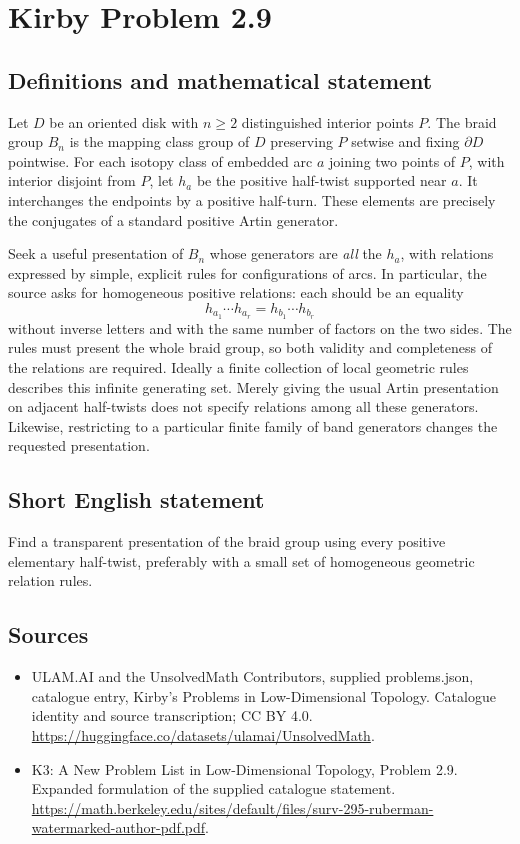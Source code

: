 \documentclass[11pt,a4paper]{article}
\begin{document}
\section*{Kirby Problem 2.9}\label{statement}

\subsection{Definitions and mathematical statement}
Let $D$ be an oriented disk with $n\geq2$ distinguished interior points $P$.
The braid group $B_n$ is the mapping class group of $D$ preserving $P$ setwise
and fixing $\partial D$ pointwise. For each isotopy class of embedded arc $a$
joining two points of $P$, with interior disjoint from $P$, let $h_a$ be the
positive half-twist supported near $a$. It interchanges the endpoints by a
positive half-turn. These elements are precisely the conjugates of a standard
positive Artin generator.

Seek a useful presentation of $B_n$ whose generators are \emph{all} the $h_a$,
with relations expressed by simple, explicit rules for configurations of arcs.
In particular, the source asks for homogeneous positive relations: each should
be an equality
\[
 h_{a_1}\cdots h_{a_r}=h_{b_1}\cdots h_{b_r}
\]
without inverse letters and with the same number of factors on the two sides.
The rules must present the whole braid group, so both validity and completeness
of the relations are required. Ideally a finite collection of local geometric
rules describes this infinite generating set. Merely giving the usual Artin
presentation on adjacent half-twists does not specify relations among all these
generators. Likewise, restricting to a particular finite family of band generators
changes the requested presentation.
\subsection{Short English statement}
Find a transparent presentation of the braid group using every positive elementary half-twist, preferably with a small set of homogeneous geometric relation rules.
\subsection{Sources}
\begin{itemize}
\item[S1] ULAM.AI and the UnsolvedMath Contributors, supplied problems.json, catalogue entry, Kirby's Problems in Low-Dimensional Topology. Catalogue identity and source transcription; CC BY 4.0.
\url{https://huggingface.co/datasets/ulamai/UnsolvedMath}.
\item[S2] K3: A New Problem List in Low-Dimensional Topology, Problem 2.9. Expanded formulation of the supplied catalogue statement.
\url{https://math.berkeley.edu/sites/default/files/surv-295-ruberman-watermarked-author-pdf.pdf}.
\end{itemize}
\end{document}
